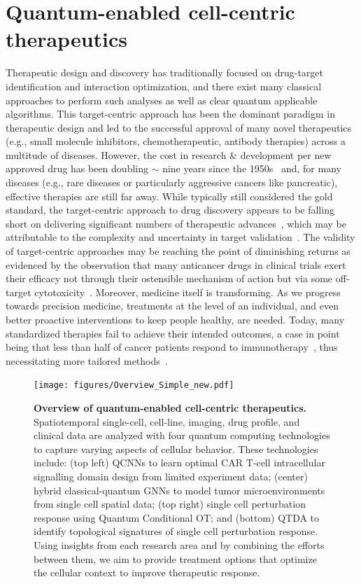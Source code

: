 \documentclass{article}
\begin{document}
\section{Quantum-enabled cell-centric therapeutics}
Therapeutic design and discovery has traditionally focused on drug-target identification and interaction optimization, and there exist many classical approaches to perform such analyses as well as clear quantum applicable algorithms. This target-centric approach has been the dominant paradigm in therapeutic design and led to the successful approval of many novel therapeutics (e.g., small molecule inhibitors, chemotherapeutic, antibody therapies) across a multitude of diseases. However, the cost in research \& development per new approved drug has been doubling $\sim$ nine years since the 1950s~\cite{scannell2012diagnosing} and, for many diseases (e.g., rare diseases or particularly aggressive cancers like pancreatic), effective therapies are still far away. 
While typically still considered the gold standard, the target-centric approach to drug discovery appears to be falling short on delivering significant numbers of therapeutic advances~\cite{moffat2017opportunities}, 
which may be attributable to the complexity and uncertainty in target validation~\cite{sams2005target}.
The validity of target-centric approaches may be reaching the point of diminishing returns as evidenced by the observation that many anticancer drugs in clinical trials exert their efficacy not through their ostensible mechanism of action but via some off-target cytotoxicity~\cite{lin2019off}. Moreover, medicine itself is transforming. As we progress towards precision medicine, treatments at the level of an individual, and even better proactive interventions to keep people healthy, are needed. Today, many standardized therapies fail to achieve their intended outcomes, a case in point being that less than half of cancer patients respond to immunotherapy~\cite{sharma2017primary}, thus necessitating more tailored methods~\cite{abbott2021quantum}.

\begin{figure}[ht]
    \centering
\texttt{[image: figures/Overview\_Simple\_new.pdf]}
    \caption{\textbf{Overview of quantum-enabled cell-centric therapeutics.}\\
    Spatiotemporal single-cell, cell-line, imaging, drug profile, and clinical data are analyzed with four quantum computing technologies to capture varying aspects of cellular behavior. These technologies include: (top left) QCNNs to learn optimal CAR T-cell intracellular signalling domain design from limited experiment data; (center) hybrid classical-quantum GNNs to model tumor microenvironments from single cell spatial data; (top right) single cell perturbation response using Quantum Conditional OT; and (bottom) QTDA to identify topological signatures of single cell perturbation response. Using insights from each research area and by combining the efforts between them, we aim to provide treatment options that optimize the cellular context to improve therapeutic response.\\
    }
    \label{fig:overview}
\end{figure}
\end{document}
